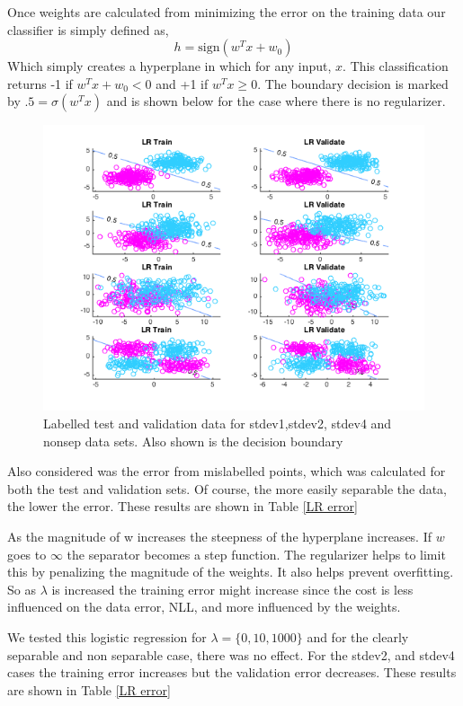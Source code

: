 \documentclass[12pt, twocolumn]{article}
\begin{document}
 Once weights are calculated from minimizing the error on the training data our classifier is simply defined as, 
 \begin{equation}
 h=\textrm{sign}(w^Tx +w_0)
 \end{equation}
 Which simply creates a hyperplane in which for any input, $x$. This classification returns -1 if $w^Tx+w_0<0$ and +1 if $w^Tx\geq 0$. The boundary decision is marked by $.5= \sigma (w^Tx)$ and is shown below for the case where there is no regularizer. 
 

 
 \begin{figure}[H]
\center
\includegraphics[scale =.4]{p1lambda0.png}
\caption{Labelled test and validation data for stdev1,stdev2, stdev4 and nonsep data sets. Also shown is the decision boundary }
\end{figure}
 
 Also considered was the error from mislabelled points, which was calculated for both the test and validation sets. Of course, the more easily separable the data, the lower the error. These results are shown in Table \ref{LR error}

As the magnitude of w increases the steepness of the hyperplane increases.  If $w$ goes to $ \infty$ the separator becomes a step function. The regularizer helps to limit this by penalizing the magnitude of the weights. It also helps prevent overfitting. So as $\lambda$ is increased the training error might increase since the cost is less influenced on the data error, NLL, and more influenced by the weights. 


We tested this logistic regression for $\lambda= \{0, 10, 1000\}$ and for the clearly separable and non separable case, there was no effect. For the stdev2, and stdev4 cases the training error increases but the validation error decreases. These results are shown in Table \ref{LR error}
\end{document}
